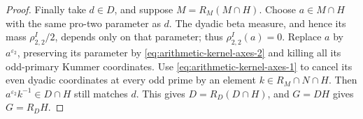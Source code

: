 \begin{proof}
Finally take \(d\in D\), and suppose
\(M=R_M(M\cap H)\). Choose \(a\in M\cap H\) with the same
pro-two parameter as \(d\). The dyadic beta measure, and hence
its mass \(\rho_{2,2}^I/2\), depends only on that parameter;
thus \(\rho_{2,2}^I(a)=0\). Replace \(a\) by
\(a^{\varepsilon_2}\), preserving its parameter by \eqref{eq:arithmetic-kernel-axes-2}
and killing all its odd-primary Kummer coordinates.
Use \eqref{eq:arithmetic-kernel-axes-1} to cancel its even dyadic coordinates at every odd
prime by an element \(k\in R_M\cap N\cap H\).
Then \(a^{\varepsilon_2}k^{-1}\in D\cap H\) still matches \(d\).
This gives \(D=R_D(D\cap H)\), and \(G=DH\) gives \(G=R_DH\).
\end{proof}
